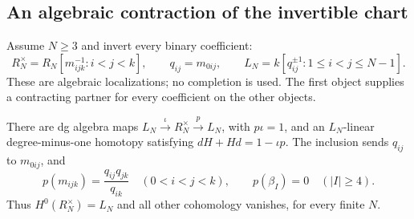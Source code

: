 \subsection{An algebraic contraction of the invertible chart}

Assume $N\geq3$ and invert every binary coefficient:
\[
 R_N^\times=R_N[m_{ijk}^{-1}:i<j<k],\qquad
 q_{ij}=m_{0ij},\qquad
 L_N=k[q_{ij}^{\pm1}:1\leq i<j\leq N-1].
\]
These are algebraic localizations; no completion is used.
The first object supplies a contracting partner for every
coefficient on the other objects.

\begin{theorem}\label{thm:vol2-directed-invertible-chart}
There are dg algebra maps
$L_N\xrightarrow{\iota}R_N^\times\xrightarrow{p}L_N$,
with $p\iota=1$, and an $L_N$-linear degree-minus-one
homotopy satisfying $dH+Hd=1-\iota p$.
The inclusion sends $q_{ij}$ to $m_{0ij}$, and
\begin{equation}\label{eq:vol2-directed-retraction}
 p(m_{ijk})=\frac{q_{ij}q_{jk}}{q_{ik}}\quad(0<i<j<k),
 \qquad p(\beta_I)=0\quad(|I|\geq4).
\end{equation}
Thus $H^0(R_N^\times)=L_N$ and all other cohomology
vanishes, for every finite $N$.
\end{theorem}

